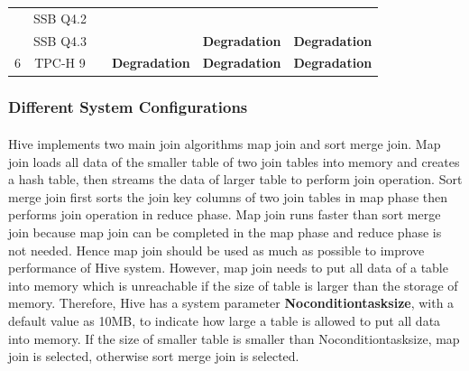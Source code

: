\begin{table}[]
{\begin{tabular}{@{}cccccc@{}}
                                 & SSB Q4.2               & \multicolumn{1}{c}{}                     & \multicolumn{1}{c}{}                     & \multicolumn{1}{c}{}                     &                      \\  
                                 & SSB Q4.3               & \multicolumn{1}{c}{}                     & \multicolumn{1}{c}{}                     & \multicolumn{1}{c}{\textbf{Degradation}} & \textbf{Degradation} \\ \midrule
    6                            & TPC-H 9                & \multicolumn{1}{c}{}                     & \multicolumn{1}{c}{\textbf{Degradation}} & \multicolumn{1}{c}{\textbf{Degradation}} & \textbf{Degradation} \\ \bottomrule
    \end{tabular}%
    }
    \end{table}
        
    \subsubsection{Different System Configurations}
        \paragraph{}
        Hive implements two main join algorithms map join and sort merge join. Map join loads all data of the smaller table of two join tables into memory and creates
        a hash table, then streams the data of larger table to perform join operation. Sort merge join first sorts the join key columns of two join tables in map phase 
        then performs join operation in reduce phase. Map join runs faster than sort merge join because map join can be completed in the map phase and reduce phase is not needed. 
        Hence map join should be used as much as possible to improve performance of Hive system. However, map join needs to put all data of a table into memory which is 
        unreachable if the size of table is larger than the storage of memory. Therefore, Hive has a system parameter \textbf{Noconditiontasksize}, with a default value
        as 10MB, to indicate how large a table is allowed to put all data into memory. If the size of smaller table is smaller than Noconditiontasksize, map join is 
        selected, otherwise sort merge join is selected. 
